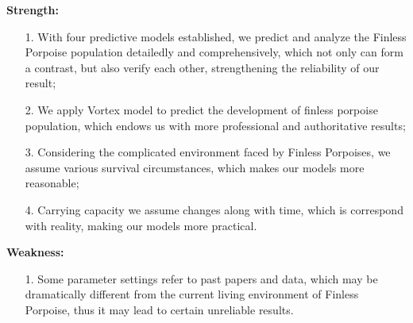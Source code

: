 \documentclass{mcmthesis}
\numberwithin{figure}{section}
\numberwithin{table}{section}
\numberwithin{equation}{section}
\begin{document}
\textbf{Strength:}

\begin{enumerate}
  \item [1.] With four predictive models established, we predict and 
  analyze the Finless Porpoise population detailedly and comprehensively, 
  which not only can form a contrast, but also verify each other, 
  strengthening the reliability of our result;
  \item [2.] We apply Vortex model to predict the development of finless
  porpoise population, which endows us with more professional and 
  authoritative results;
  \item [3.] Considering the complicated environment faced by
  Finless Porpoises, we assume various survival circumstances, which 
  makes our models more reasonable; 
  \item [4.] Carrying capacity we assume changes along with time, 
  which is correspond with reality, making our models more practical.
\end{enumerate}

\textbf{Weakness:}

\begin{enumerate}
  \item [1.] Some parameter settings refer to past papers and 
  data, which may be dramatically different from the current living 
  environment of Finless Porpoise, thus it may lead to certain
  unreliable results.
\end{enumerate}
\end{document}
